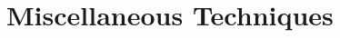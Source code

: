 \documentclass[oneside]{book}
\begin{document}
    

\begin{savequote}

\end{savequote}
\chapter{Miscellaneous Techniques} \label{chapter:misctechniques}

    

\chapter*{}

\vspace*{\fill}
\begin{center}
\end{center}
\vspace*{\fill}

\appendix
\appendixpage
\noappendicestocpagenum
\addappheadtotoc
\end{document}
